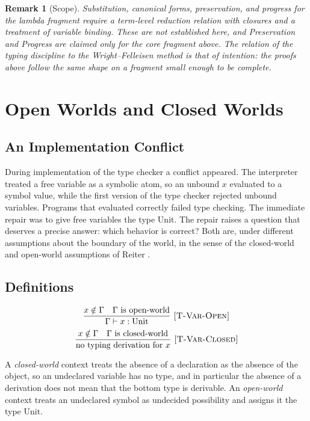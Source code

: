 \documentclass[12pt,oneside,openany]{book}
\theoremstyle{spherepop}
\theoremstyle{remarkstyle}
\newtheorem{remark}[definition]{Remark}
\begin{document}
\begin{remark}[Scope]
Substitution, canonical forms, preservation, and progress for the lambda fragment require a term-level reduction relation with closures and a treatment of variable binding. These are not established here, and Preservation and Progress are claimed only for the core fragment above. The relation of the typing discipline to the Wright--Felleisen method \cite{wf} is that of intention: the proofs above follow the same shape on a fragment small enough to be complete.
\end{remark}

\chapter{Open Worlds and Closed Worlds}
\label{ch:worlds}

\section{An Implementation Conflict}

During implementation of the type checker a conflict appeared. The interpreter treated a free variable as a symbolic atom, so an unbound $x$ evaluated to a symbol value, while the first version of the type checker rejected unbound variables. Programs that evaluated correctly failed type checking. The immediate repair was to give free variables the type $\mathrm{Unit}$. The repair raises a question that deserves a precise answer: which behavior is correct? Both are, under different assumptions about the boundary of the world, in the sense of the closed-world and open-world assumptions of Reiter \cite{reiter}.

\section{Definitions}

\[
\frac{x\notin\Gamma\quad\Gamma\ \text{is open-world}}{\Gamma\vdash x:\mathrm{Unit}}\ \textsc{[T-Var-Open]}
\]
\[
\frac{x\notin\Gamma\quad\Gamma\ \text{is closed-world}}{\text{no typing derivation for }x}\ \textsc{[T-Var-Closed]}
\]

A \emph{closed-world} context treats the absence of a declaration as the absence of the object, so an undeclared variable has no type, and in particular the absence of a derivation does not mean that the bottom type is derivable. An \emph{open-world} context treats an undeclared symbol as undecided possibility and assigns it the type $\mathrm{Unit}$.
\end{document}
